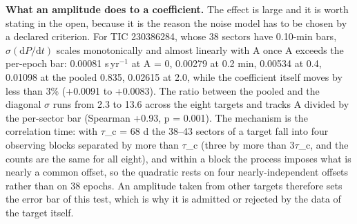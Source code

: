 \documentclass{aa}
\begin{document}
\textbf{What an amplitude does to a coefficient.} The effect is large and it is worth stating in the open, because it is the reason the noise model has to be chosen by a declared criterion. For TIC 230386284, whose 38 sectors have 0.10-min bars, $\sigma(\mathrm{d}P/\mathrm{d}t)$ scales monotonically and almost linearly with A once A exceeds the per-epoch bar: 0.00081 s\,yr$^{-1}$ at A = 0, 0.00279 at 0.2 min, 0.00534 at 0.4, 0.01098 at the pooled 0.835, 0.02615 at 2.0, while the coefficient itself moves by less than 3\% (+0.0091 to +0.0083). The ratio between the pooled and the diagonal $\sigma$ runs from 2.3 to 13.6 across the eight targets and tracks A divided by the per-sector bar (Spearman +0.93, p = 0.001). The mechanism is the correlation time: with $\tau$\_c = 68 d the 38--43 sectors of a target fall into four observing blocks separated by more than $\tau$\_c (three by more than 3$\tau$\_c, and the counts are the same for all eight), and within a block the process imposes what is nearly a common offset, so the quadratic rests on four nearly-independent offsets rather than on 38 epochs. An amplitude taken from other targets therefore sets the error bar of this test, which is why it is admitted or rejected by the data of the target itself.
\end{document}
